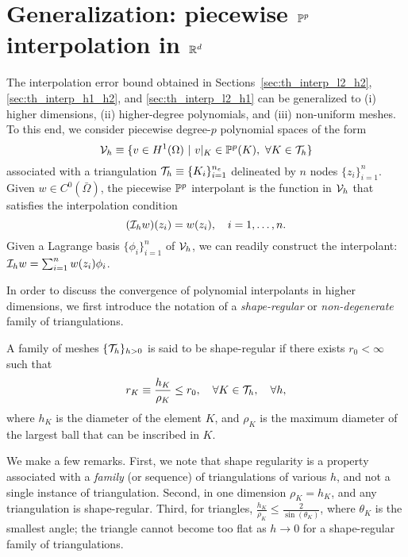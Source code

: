 \section{Generalization: piecewise $\mathbb{P}^p$ interpolation in $\mathbb{R}^d$}
\label{sec:th_poly_gen}
The interpolation error bound obtained in Sections~\ref{sec:th_interp_l2_h2}, \ref{sec:th_interp_h1_h2}, and \ref{sec:th_interp_l2_h1} can be generalized to (i) higher dimensions, (ii) higher-degree polynomials, and (iii) non-uniform meshes.  To this end, we consider piecewise degree-$p$ polynomial spaces of the form
  \begin{equation*}
    \mathcal{V}_h \equiv \{ v \in H^1(\Omega) \ | \ v|_K \in \mathbb{P}^p(K), \ \forall K \in \mathcal{T}_h \} 
  \end{equation*}
  associated with a triangulation $\mathcal{T}_h \equiv \{ K_i\}_{i=1}^{n_e}$ delineated by $n$ nodes $\{z_i\}_{i=1}^n$. Given $w \in C^0(\bar \Omega)$, the piecewise $\mathbb{P}^p$ interpolant is the function in $\mathcal{V}_h$ that satisfies the interpolation condition
  \begin{equation*}
    (\mathcal{I}_h w)(z_i) = w(z_i), \quad i = 1,\dots, n.
  \end{equation*}
  Given a Lagrange basis $\{\phi_i\}_{i=1}^n$ of $\mathcal{V}_h$, we can readily construct the interpolant: $\mathcal{I}_h w = \sum_{i=1}^n w(z_i) \phi_i$.
  
In order to discuss the convergence of polynomial interpolants in higher dimensions, we first introduce the notation of a \emph{shape-regular} or \emph{non-degenerate} family of triangulations.
\begin{definition}
  \label{def:th_shape_reg_affine}
  A family of meshes $\{ \mathcal{T}_h \}_{h > 0}$ is said to be shape-regular if there exists $r_0 < \infty$ such that 
  \begin{equation*}
    r_K \equiv \frac{h_K}{\rho_K} \leq r_0, \quad \forall K \in \mathcal{T}_h, \quad \forall h ,
  \end{equation*}
  where $h_K$ is the diameter of the element $K$, and $\rho_K$ is the maximum diameter of the largest ball that can be inscribed in $K$.
\end{definition}
We make a few remarks. First, we note that shape regularity is a property associated with a \emph{family} (or sequence) of triangulations of various $h$, and not a single instance of triangulation.  Second, in one dimension $\rho_K = h_K$, and any triangulation is shape-regular.  Third, for triangles, $\frac{h_K}{\rho_K} \leq \frac{2}{\sin(\theta_K)}$, where $\theta_K$ is the smallest angle; the triangle cannot become too flat as $h \to 0$ for a shape-regular family of triangulations.


